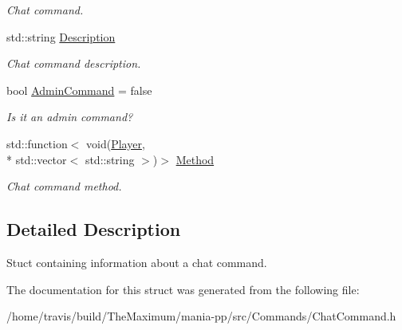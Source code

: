 \begin{DoxyCompactItemize}
\begin{DoxyCompactList}\small\item\em Chat command. \end{DoxyCompactList}\item 
\hypertarget{structChatCommand_add2fe44a7c9b7b07982dce3ca848ab53}{std\-::string \hyperlink{structChatCommand_add2fe44a7c9b7b07982dce3ca848ab53}{Description}}\label{structChatCommand_add2fe44a7c9b7b07982dce3ca848ab53}

\begin{DoxyCompactList}\small\item\em Chat command description. \end{DoxyCompactList}\item 
\hypertarget{structChatCommand_a578c28daa0d4ebfa3b4ca99dd5f36579}{bool \hyperlink{structChatCommand_a578c28daa0d4ebfa3b4ca99dd5f36579}{Admin\-Command} = false}\label{structChatCommand_a578c28daa0d4ebfa3b4ca99dd5f36579}

\begin{DoxyCompactList}\small\item\em Is it an admin command? \end{DoxyCompactList}\item 
\hypertarget{structChatCommand_a288ccc66531286af1103bd2a83c09ec5}{std\-::function$<$ void(\hyperlink{structPlayer}{Player}, \\*
std\-::vector$<$ std\-::string $>$)$>$ \hyperlink{structChatCommand_a288ccc66531286af1103bd2a83c09ec5}{Method}}\label{structChatCommand_a288ccc66531286af1103bd2a83c09ec5}

\begin{DoxyCompactList}\small\item\em Chat command method. \end{DoxyCompactList}\end{DoxyCompactItemize}


\subsection{Detailed Description}
Stuct containing information about a chat command. 

The documentation for this struct was generated from the following file\-:\begin{DoxyCompactItemize}
\item 
/home/travis/build/\-The\-Maximum/mania-\/pp/src/\-Commands/Chat\-Command.\-h\end{DoxyCompactItemize}
